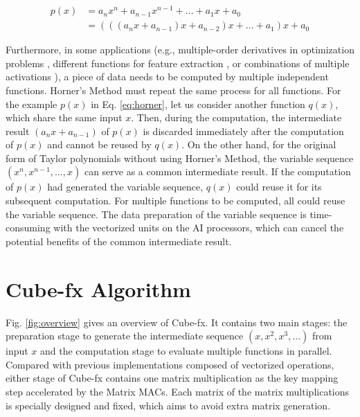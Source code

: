 \begin{equation}
    \label{eq:horner}
    \begin{aligned}
    p(x) &= a_n x^n + a_{n - 1}x^{n - 1} + ... + a_1 x + a_0 \\
         &= (((a_n x + a_{n - 1}) x + a_{n - 2})x + ... + a_1) x + a_0 
    \end{aligned}
    \end{equation}

Furthermore, in some applications (e.g., multiple-order derivatives in optimization problems \cite{boyd2004convex}, different functions for feature extraction \cite{guyon2006introduction}, or combinations of multiple activations \cite{DBLP:conf/icpr/ManessiR18}), a piece of data needs to be computed by multiple independent functions. Horner's Method must repeat the same process for all functions. For the example $p(x)$ in Eq. \ref{eq:horner}, let us consider another function $q(x)$, which share the same input $x$.
Then, during the computation, the intermediate result $(a_nx + a_{n-1})$ of $p(x)$ is discarded immediately after the computation of $p(x)$ and cannot be reused by $q(x)$. On the other hand, for the original form of Taylor polynomials without using Horner's Method, the variable sequence $(x^n, x^{n-1}, ..., x)$ can serve as a common intermediate result. If the computation of $p(x)$ had generated the variable sequence, $q(x)$ could reuse it for its subsequent computation. For multiple functions to be computed, all could reuse the variable sequence. The data preparation of the variable sequence is time-consuming with the vectorized units on the AI processors, which can cancel the potential benefits of the common intermediate result.


\section{Cube-fx Algorithm \label{sec:3}}

Fig. \ref{fig:overview} gives an overview of Cube-fx. It contains two main stages: the preparation stage to generate the intermediate sequence $(x, x^2, x^3, ...)$ from input $x$ and the computation stage to evaluate multiple functions in parallel. Compared with previous implementations composed of vectorized operations, either stage of Cube-fx contains one matrix multiplication as the key mapping step accelerated by the Matrix MACs. Each matrix of the matrix multiplications is specially designed and fixed, which aims to avoid extra matrix generation. 

